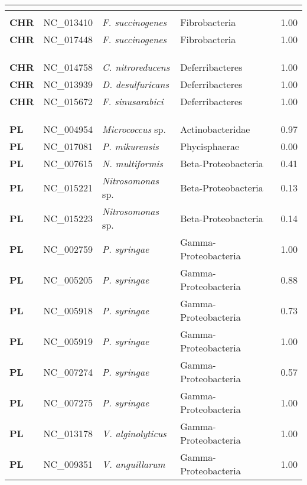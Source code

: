 \begin{adjustwidth}{-3cm}{2cm}
{\begin{supertabular}{>{\bfseries}l|p{0.1\textwidth}p{0.14\textwidth}l|l}
\\
\hline\\
CHR & NC\_013410 & \textit{F. succinogenes} & Fibrobacteria & 1.00\\
CHR & NC\_017448 & \textit{F. succinogenes} & Fibrobacteria & 1.00\\
\\
\\
\hline\\
CHR & NC\_014758 &  \textit{C. nitroreducens} & Deferribacteres & 1.00\\
CHR & NC\_013939 &  \textit{D. desulfuricans} & Deferribacteres & 1.00\\
CHR & NC\_015672 &  \textit{F. sinusarabici} & Deferribacteres & 1.00\\
\\
\\
\hline\\
PL & NC\_004954 &  \textit{Micrococcus} sp. & Actinobacteridae & 0.97\\
PL & NC\_017081 &  \textit{P. mikurensis} & Phycisphaerae & 0.00\\
PL & NC\_007615 &  \textit{N. multiformis} & Beta-Proteobacteria & 0.41\\
PL & NC\_015221 &  \textit{Nitrosomonas} sp. & Beta-Proteobacteria & 0.13\\
PL & NC\_015223 &  \textit{Nitrosomonas} sp. & Beta-Proteobacteria & 0.14\\
PL & NC\_002759 &  \textit{P. syringae} & Gamma-Proteobacteria & 1.00\\
PL & NC\_005205 &  \textit{P. syringae} & Gamma-Proteobacteria & 0.88\\
PL & NC\_005918 &  \textit{P. syringae} & Gamma-Proteobacteria & 0.73\\
PL & NC\_005919 &  \textit{P. syringae} & Gamma-Proteobacteria & 1.00\\
PL & NC\_007274 &  \textit{P. syringae} & Gamma-Proteobacteria & 0.57\\
PL & NC\_007275 &  \textit{P. syringae} & Gamma-Proteobacteria & 1.00\\
PL & NC\_013178 &  \textit{V. alginolyticus} & Gamma-Proteobacteria & 1.00\\
PL & NC\_009351 &  \textit{V. anguillarum} & Gamma-Proteobacteria & 1.00\\

\end{supertabular}}
\end{adjustwidth}
